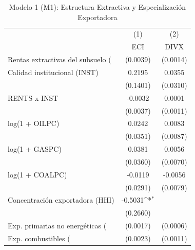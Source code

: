 \begin{table}[htbp]\centering
\def\sym#1{\ifmmode^{#1}\else\(^{#1}\)\fi}
\caption{Modelo 1 (M1): Estructura Extractiva y Especialización Exportadora}
\begin{tabular}{l*{2}{c}}
\toprule
                    &\multicolumn{1}{c}{(1)}&\multicolumn{1}{c}{(2)}\\
                    &\multicolumn{1}{c}{ECI}&\multicolumn{1}{c}{DIVX}\\
\midrule
Rentas extractivas del subsuelo (%
                    &    (0.0039)         &    (0.0014)         \\
\addlinespace
Calidad institucional (INST)&      0.2195         &      0.0355         \\
                    &    (0.1401)         &    (0.0310)         \\
\addlinespace
RENTS x INST        &     -0.0032         &      0.0001         \\
                    &    (0.0037)         &    (0.0011)         \\
\addlinespace
log(1 + OILPC)      &      0.0242         &      0.0083         \\
                    &    (0.0351)         &    (0.0087)         \\
\addlinespace
log(1 + GASPC)      &      0.0381         &      0.0056         \\
                    &    (0.0360)         &    (0.0070)         \\
\addlinespace
log(1 + COALPC)     &     -0.0119         &     -0.0056         \\
                    &    (0.0291)         &    (0.0079)         \\
\addlinespace
Concentración exportadora (HHI)&     -0.5031\sym{*}  &                     \\
                    &    (0.2660)         &                     \\
\addlinespace
Exp. primarias no energéticas (%
                    &    (0.0017)         &    (0.0006)         \\
\addlinespace
Exp. combustibles (%
                    &    (0.0023)         &    (0.0011)         \\

\end{tabular}
\end{table}
